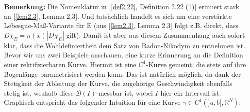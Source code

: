\textbf{Bemerkung:} Die Nomenklatur in [\ref{def2.22}, Definition 2.22 (1)] erinnert stark an [\ref{lem2.3}, Lemma 2.3]. Und tatsächlich handelt es sich um eine verstärkte Lebesgue-Maß-Variante für E (aus [\ref{lem2.3}, Lemma 2.3] folgt z.B. direkt, dass \(D \chi_E = n(x) |D \chi_E|\) gilt). Damit ist aber aus diesem Zusammenhang auch sofort klar, dass die Wohldefiniertheit dem Satz von Radon-Nikodym zu entnehmen ist.\\

Bevor wir uns zwei Beispiele anschauen, eine kurze Erinnerung an die Definition einer rektifizierbaren Kurve. Hiermit ist eine \(C^1\)-Kurve gemeint, die stets auf ihre Bogenlänge parametrisiert werden kann. Das ist natürlich möglich, da dank der Stetigkeit der Ableitung der Kurve, die zugehörige Geschwindigkeit ebenfalls stetig ist, weshalb diese \(\mathcal{B}(I)\)-messbar ist, wobei \(I\) hier ein Intervall ist. Graphisch entspricht das folgender Intuition für eine Kurve \(\gamma \in C^1(]a,b[,\mathbb{R}^N)\):
\begin{figure}[label={fig:rectcurve}, caption={Rektifizierung von \(\gamma\) für \(N=1\): Parametrisierung auf Bogenlänge durch Umparametrisierung mit \(\Phi\)}]
  \centering
{}
\end{figure}

